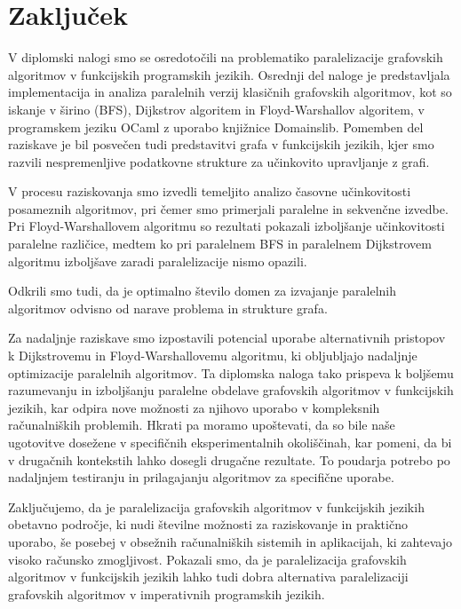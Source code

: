 \documentclass[fin1, tisk]{fmfdelo}
\begin{document}
\section{Zaključek}

V diplomski nalogi smo se osredotočili na problematiko paralelizacije grafovskih algoritmov v funkcijskih programskih jezikih.
Osrednji del naloge je predstavljala implementacija in analiza paralelnih verzij klasičnih grafovskih algoritmov, kot so iskanje v širino (BFS),
Dijkstrov algoritem in Floyd-Warshallov algoritem, v programskem jeziku OCaml z uporabo knjižnice Domainslib. Pomemben del raziskave je
bil posvečen tudi predstavitvi grafa v funkcijskih jezikih, kjer smo razvili nespremenljive podatkovne strukture za učinkovito upravljanje z grafi.

V procesu raziskovanja smo izvedli temeljito analizo časovne učinkovitosti posameznih algoritmov, pri čemer smo primerjali paralelne in sekvenčne izvedbe.
Pri Floyd-Warshallovem algoritmu so rezultati pokazali izboljšanje učinkovitosti paralelne različice, medtem ko pri paralelnem BFS in paralelnem Dijkstrovem
algoritmu izboljšave zaradi paralelizacije nismo opazili. 

Odkrili smo tudi, da je optimalno število domen za izvajanje paralelnih algoritmov odvisno od narave problema
in strukture grafa.

Za nadaljnje raziskave smo izpostavili potencial uporabe alternativnih pristopov k Dijkstrovemu in Floyd-Warshallovemu algoritmu, ki obljubljajo nadaljnje
optimizacije paralelnih algoritmov. Ta diplomska naloga tako prispeva k boljšemu razumevanju in izboljšanju paralelne obdelave grafovskih
algoritmov v funkcijskih jezikih, kar odpira nove možnosti za njihovo uporabo v kompleksnih računalniških problemih.
Hkrati pa moramo upoštevati, da so bile naše ugotovitve dosežene v specifičnih eksperimentalnih okoliščinah, kar pomeni, da bi v drugačnih
kontekstih lahko dosegli drugačne rezultate. To poudarja potrebo po nadaljnjem testiranju in prilagajanju algoritmov za specifične uporabe.

Zaključujemo, da je paralelizacija grafovskih algoritmov v funkcijskih jezikih obetavno področje, ki nudi številne možnosti za raziskovanje in
praktično uporabo, še posebej v obsežnih računalniških sistemih in aplikacijah, ki zahtevajo visoko računsko zmogljivost.
Pokazali smo, da je paralelizacija grafovskih algoritmov v funkcijskih jezikih lahko tudi dobra alternativa paralelizaciji grafovskih algoritmov
v imperativnih programskih jezikih.
\end{document}
